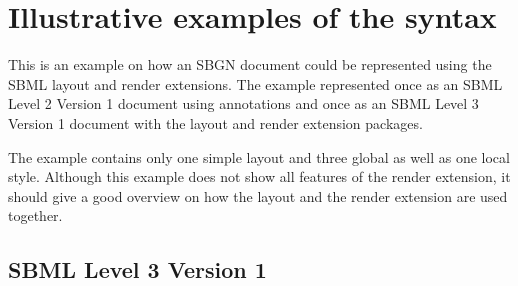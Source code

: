 
\section{Illustrative examples of the \Render syntax}
\label{examples}


This is an example on how an SBGN document could be represented using the SBML layout and render extensions. The example represented once as an SBML Level 2 Version 1 document using annotations and once as an SBML Level 3 Version 1 document with the layout and render extension packages.

The example contains only one simple layout and three global as well as one local style.
Although this example does not show all features of the render extension, it should give a good overview on how the layout and the render extension are used together.

\subsection*{SBML Level 3 Version 1}

